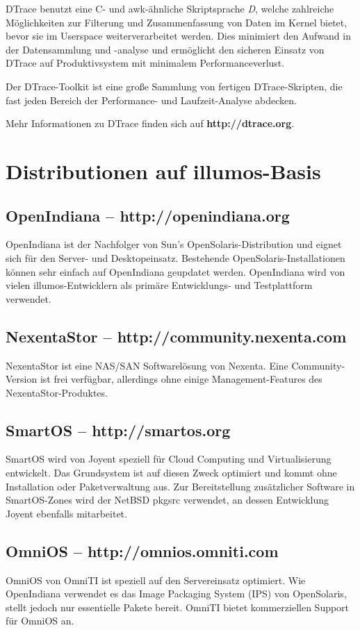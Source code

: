 \documentclass[11pt,foldmark,notumble]{leaflet}
\begin{document}
DTrace benutzt eine C- und awk-ähnliche Skriptsprache \emph{D},
welche zahlreiche Möglichkeiten zur Filterung und Zusammenfassung
von Daten im Kernel bietet, bevor sie im Userspace weiterverarbeitet
werden. Dies minimiert den Aufwand in der Datensammlung und -analyse
und ermöglicht den sicheren Einsatz von DTrace auf Produktivsystem mit
minimalem Performanceverlust.

Der DTrace-Toolkit ist eine große Sammlung von fertigen
DTrace-Skripten, die fast jeden Bereich der Performance- und
Laufzeit-Analyse abdecken.

Mehr Informationen zu DTrace finden sich auf \textbf{http://dtrace.org}.

\section{Distributionen auf illumos-Basis}
\subsection{OpenIndiana -- http://openindiana.org}
OpenIndiana ist der Nachfolger von Sun's OpenSolaris-Distribution und
eignet sich für den Server- und Desktopeinsatz. Bestehende
OpenSolaris-Installationen können sehr einfach auf OpenIndiana
geupdatet werden. OpenIndiana wird von vielen illumos-Entwicklern als
primäre Entwicklungs- und Testplattform verwendet.

\subsection{NexentaStor -- http://community.nexenta.com}
NexentaStor ist eine NAS/SAN Softwarelösung von Nexenta. Eine
Community-Version ist frei verfügbar, allerdings ohne einige
Management-Features des NexentaStor-Produktes.

\subsection{SmartOS -- http://smartos.org}
SmartOS wird von Joyent speziell für Cloud Computing und
Virtualisierung entwickelt. Das Grundsystem ist auf diesen Zweck
optimiert und kommt ohne Installation oder Paketverwaltung aus. Zur
Bereitstellung zusätzlicher Software in SmartOS-Zones wird der NetBSD
pkgsrc verwendet, an dessen Entwicklung Joyent ebenfalls mitarbeitet.

\subsection{OmniOS -- http://omnios.omniti.com}
OmniOS von OmniTI ist speziell auf den Servereinsatz optimiert. Wie
OpenIndiana verwendet es das Image Packaging System (IPS) von
OpenSolaris, stellt jedoch nur essentielle Pakete bereit. OmniTI
bietet kommerziellen Support für OmniOS an.
\end{document}
